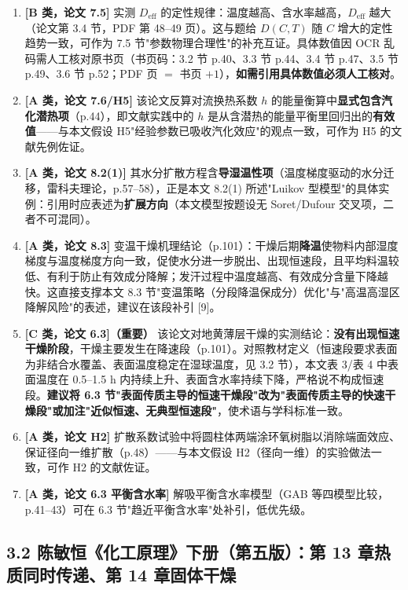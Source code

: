 \documentclass[12pt,a4paper]{ctexart}
\begin{document}
\begin{enumerate}[leftmargin=2em]
\item \textbf{[B 类，论文 7.5]} 实测 $D_{\mathrm{eff}}$ 的定性规律：温度越高、含水率越高，$D_{\mathrm{eff}}$ 越大（论文第 3.4 节，PDF 第 48--49 页）。这与题给 $D(C,T)$ 随 $C$ 增大的定性趋势一致，可作为 7.5 节"参数物理合理性"的补充互证。具体数值因 OCR 乱码需人工核对原书页（书页码：3.2 节 p.40、3.3 节 p.44、3.4 节 p.47、3.5 节 p.49、3.6 节 p.52；PDF 页 $=$ 书页 $+1$），\textbf{如需引用具体数值必须人工核对}。
\item \textbf{[A 类，论文 7.6/H5]} 该论文反算对流换热系数 $h$ 的能量衡算中\textbf{显式包含汽化潜热项}（p.44），即文献实践中的 $h$ 是从含潜热的能量平衡里回归出的\textbf{有效值}——与本文假设 H5"经验参数已吸收汽化效应"的观点一致，可作为 H5 的文献先例佐证。
\item \textbf{[A 类，论文 8.2(1)]} 其水分扩散方程含\textbf{导湿温性项}（温度梯度驱动的水分迁移，雷科夫理论，p.57--58），正是本文 8.2(1) 所述"Luikov 型模型"的具体实例：引用时应表述为\textbf{扩展方向}（本文模型按题设无 Soret/Dufour 交叉项，二者不可混同）。
\item \textbf{[A 类，论文 8.3]} 变温干燥机理结论（p.101）：干燥后期\textbf{降温}使物料内部湿度梯度与温度梯度方向一致，促使水分进一步脱出、出现恒速段，且平均料温较低、有利于防止有效成分降解；发汗过程中温度越高、有效成分含量下降越快。这直接支撑本文 8.3 节"变温策略（分段降温保成分）优化"与"高温高湿区降解风险"的表述，建议在该段补引 [9]。
\item \textbf{[C 类，论文 6.3]（重要）} 该论文对地黄薄层干燥的实测结论：\textbf{没有出现恒速干燥阶段}，干燥主要发生在降速段（p.101）。对照教材定义（恒速段要求表面为非结合水覆盖、表面温度稳定在湿球温度，见 3.2 节），本文表 3/表 4 中表面温度在 0.5--1.5 h 内持续上升、表面含水率持续下降，严格说不构成恒速段。\textbf{建议将 6.3 节"表面传质主导的恒速干燥段"改为"表面传质主导的快速干燥段"或加注"近似恒速、无典型恒速段"}，使术语与学科标准一致。
\item \textbf{[A 类，论文 H2]} 扩散系数试验中将圆柱体两端涂环氧树脂以消除端面效应、保证径向一维扩散（p.48）——与本文假设 H2（径向一维）的实验做法一致，可作 H2 的文献佐证。
\item \textbf{[A 类，论文 6.3 平衡含水率]} 解吸平衡含水率模型（GAB 等四模型比较，p.41--43）可在 6.3 节"趋近平衡含水率"处补引，低优先级。
\end{enumerate}

\subsection{3.2 陈敏恒《化工原理》下册（第五版）：第 13 章热质同时传递、第 14 章固体干燥}
\end{document}
